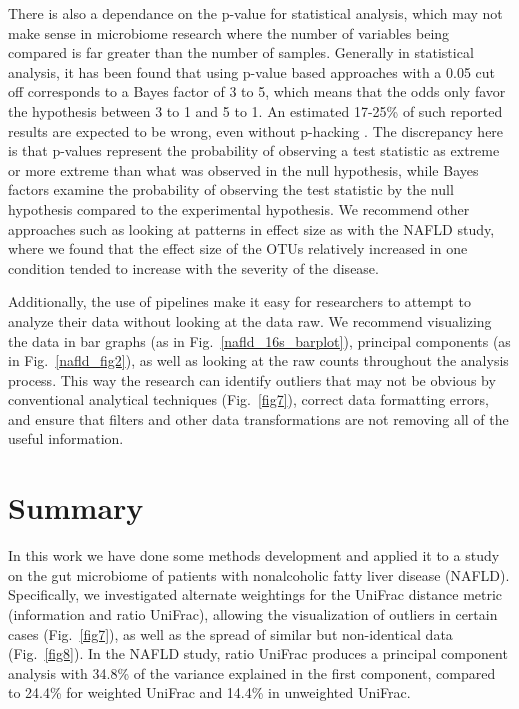 There is also a dependance on the p-value for statistical analysis, which may not make sense in microbiome research where the number of variables being compared is far greater than the number of samples. Generally in statistical analysis, it has been found that using p-value based approaches with a 0.05 cut off corresponds to a Bayes factor of 3 to 5, which means that the odds only favor the hypothesis between 3 to 1 and 5 to 1. An estimated 17-25\% of such reported results are expected to be wrong, even without p-hacking \cite{johnson2013revised}. The discrepancy here is that p-values represent the probability of observing a test statistic as extreme or more extreme than what was observed in the null hypothesis, while Bayes factors examine the probability of observing the test statistic by the null hypothesis compared to the experimental hypothesis. We recommend other approaches such as looking at patterns in effect size as with the NAFLD study, where we found that the effect size of the OTUs relatively increased in one condition tended to increase with the severity of the disease.

Additionally, the use of pipelines make it easy for researchers to attempt to analyze their data without looking at the data raw. We recommend visualizing the data in bar graphs (as in Fig.~\ref{nafld_16s_barplot}), principal components (as in Fig.~\ref{nafld_fig2}), as well as looking at the raw counts throughout the analysis process. This way the research can identify outliers that may not be obvious by conventional analytical techniques (Fig.~\ref{fig7}), correct data formatting errors, and ensure that filters and other data transformations are not removing all of the useful information.

\section{Summary}

In this work we have done some methods development and applied it to a study on the gut microbiome of patients with nonalcoholic fatty liver disease (NAFLD). Specifically, we investigated alternate weightings for the UniFrac distance metric (information and ratio UniFrac), allowing the visualization of outliers in certain cases (Fig.~\ref{fig7}), as well as the spread of similar but non-identical data (Fig.~\ref{fig8}). In the NAFLD study, ratio UniFrac produces a principal component analysis with 34.8\% of the variance explained in the first component, compared to 24.4\% for weighted UniFrac and 14.4\% in unweighted UniFrac.

